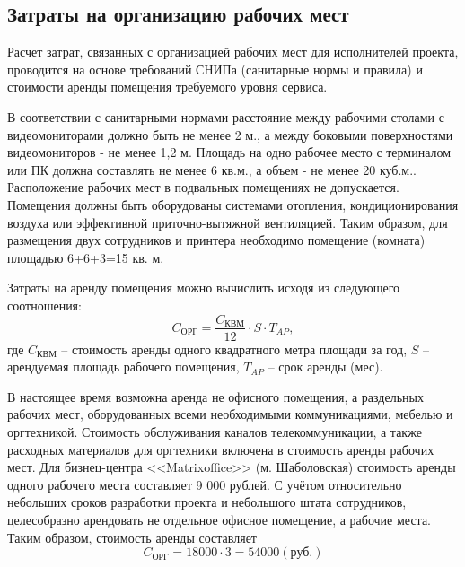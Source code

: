 \subsection{Затраты на организацию рабочих мест} \label{office_costs}

Расчет затрат, связанных с организацией рабочих мест для исполнителей проекта, проводится на основе требований СНИПа (санитарные нормы и правила) и стоимости аренды помещения требуемого уровня сервиса.

\vspace{\baselineskip}
В соответствии с санитарными нормами расстояние между рабочими столами с видеомониторами должно быть не менее 2 м., а между боковыми поверхностями видеомониторов - не менее 1,2 м. Площадь на одно рабочее место с терминалом или ПК должна составлять не менее 6 кв.м., а объем - не менее 20 куб.м.. Расположение рабочих мест в подвальных помещениях не допускается. Помещения должны быть оборудованы системами отопления, кондиционирования воздуха или эффективной приточно-вытяжной вентиляцией. Таким образом, для размещения двух сотрудников и принтера необходимо помещение (комната) площадью 6+6+3=15 кв. м.

\vspace{\baselineskip}
Затраты на аренду помещения можно вычислить исходя из следующего соотношения:
\begin{equation}
  \label{eq:office_cost_formula}
C_\textrm{ОРГ} = \frac {C_\textrm{КВМ}} {12} \cdot S \cdot T_{AP},
\end{equation}
где $C_\textrm{КВМ}$ -- стоимость аренды одного квадратного метра площади за год, $S$ -- арендуемая площадь рабочего помещения, $T_{AP}$ -- срок аренды (мес).

\vspace{\baselineskip}
В настоящее время возможна аренда не офисного помещения, а раздельных рабочих мест, оборудованных всеми необходимыми коммуникациями, мебелью и оргтехникой. Стоимость обслуживания каналов телекоммуникации, а также расходных материалов для оргтехники включена в стоимость аренды рабочих мест. Для бизнец-центра <<Matrixoffice>> (м. Шаболовская) стоимость аренды одного рабочего места составляет 9 000 рублей. С учётом относительно небольших сроков разработки проекта и небольшого штата сотрудников, целесобразно арендовать не отдельное офисное помещение, а рабочие места.
Таким образом, стоимость аренды составляет
\begin{equation}
  \label{eq:office_cost}
C_\textrm{ОРГ} = 18 000 \cdot 3 = 54000 (\textrm{руб.})
\end{equation}